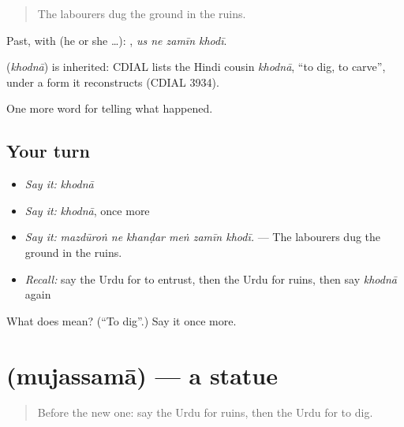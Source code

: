\begin{quote}
The labourers dug the ground in the ruins.
\end{quote}

Past, with  (he or she …):    , \emph{us ne zamīn khodī}.

\begin{cousinweb}
\textbf{} (\emph{khodnā}) is inherited: CDIAL lists the Hindi cousin \emph{khodnā}, \textquotedblleft{}to dig, to carve\textquotedblright{}, under a form it reconstructs (CDIAL 3934).
\end{cousinweb}

\begin{grammarlens}[title={What you've built}]
One more word for telling what happened.
\end{grammarlens}

\subsection*{Your turn}
\begin{itemize}
\raggedright
  \item \emph{Say it:} \emph{khodnā}
  \item \emph{Say it:} \emph{khodnā}, once more
  \item \emph{Say it:} \emph{mazdūroṅ ne khanḍar meṅ zamīn khodī.} — The labourers dug the ground in the ruins.
  \item \emph{Recall:} say the Urdu for to entrust, then the Urdu for ruins, then say \emph{khodnā} again
\end{itemize}

\begin{tcolorbox}[breakable,colback=teal!4,colframe=teal!35!black,title={Before you move on}]
What does  mean? (\textquotedblleft{}To dig\textquotedblright{}.) Say it once more.
\end{tcolorbox}
\section[\texorpdfstring{\ur{مجسمہ} (mujassamā)}{مجسمہ (mujassamā)}]{ (mujassamā) — a statue}

\label{lesson:UR-C314-mujassama}



\begin{quote}
Before the new one: say the Urdu for ruins, then the Urdu for to dig.
\end{quote}

